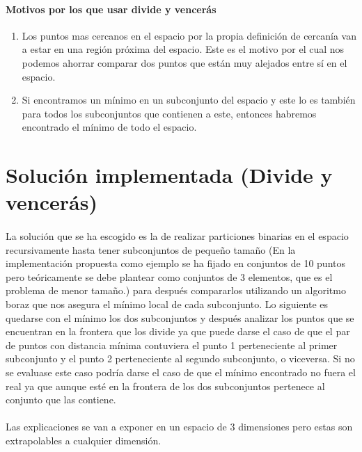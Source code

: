 \documentclass{article}
\begin{document}
		\paragraph{Motivos por los que usar divide y vencerás}

			\begin{enumerate}

				\item
				Los puntos mas cercanos en el espacio por la propia definición de cercanía van a estar en una región próxima del espacio. Este es el motivo por el cual nos podemos ahorrar comparar dos puntos que están muy alejados entre sí en el espacio.
				
				\item
				Si encontramos un mínimo en un subconjunto del espacio y este lo es también para todos los subconjuntos que contienen a este, entonces habremos encontrado el mínimo de todo el espacio.

			\end{enumerate}

\section{Solución implementada (Divide y vencerás)}

	\paragraph{}
	La solución que se ha escogido es la de realizar particiones binarias en el espacio recursivamente hasta tener subconjuntos de pequeño tamaño (En la implementación propuesta como ejemplo se ha fijado en conjuntos de 10 puntos pero teóricamente se debe plantear como conjuntos de 3 elementos, que es el problema de menor tamaño.) para después compararlos utilizando un algoritmo boraz que nos asegura el mínimo local de cada subconjunto. Lo siguiente es quedarse con el mínimo los dos subconjuntos y después analizar los puntos que se encuentran en la frontera que los divide ya que puede darse el caso de que el par de puntos con distancia mínima contuviera el punto 1 perteneciente al primer subconjunto y el punto 2 perteneciente al segundo subconjunto, o viceversa. Si no se evaluase este caso podría darse el caso de que el mínimo encontrado no fuera el real ya que aunque esté en la frontera de los dos subconjuntos pertenece al conjunto que las contiene.
	

	\paragraph{}
	Las explicaciones se van a exponer en un espacio de 3 dimensiones pero estas son extrapolables a cualquier dimensión.
\end{document}
